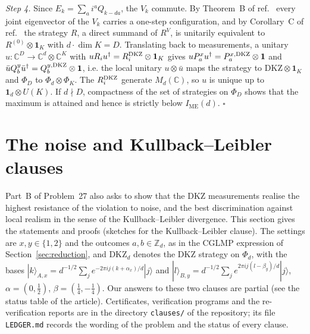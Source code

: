 \documentclass[11pt]{amsart}
\theoremstyle{definition}
\theoremstyle{remark}
\numberwithin{equation}{section}
\newcommand{\C}{\mathbb{C}}
\newcommand{\Z}{\mathbb{Z}}
\newcommand{\one}{\mathbf{1}}
\newcommand{\IME}{I_{\mathrm{ME}}}
\newcommand{\DKZ}{\mathrm{DKZ}}
\begin{document}
\emph{Step 4.} Since $E_k=\sum_ai^aQ_{k-da}$, the $V_k$ commute. By Theorem~B of ref.~\cite{classical} every joint
eigenvector of the $V_k$ carries a one-step configuration, and by Corollary~C of ref.~\cite{classical} the strategy
$R$, a direct summand of $R^V$, is unitarily equivalent to $R^{(0)}\otimes\one_K$ with $d\cdot\dim K=D$. Translating back
to measurements, a unitary $u:\C^D\to\C^d\otimes\C^K$ with $uR_iu^\dagger=R^{\rm DKZ}_i\otimes\one_K$ gives
$uP^x_au^\dagger=P^{x,\rm DKZ}_a\otimes\one$ and $\bar uQ^y_b\bar u^\dagger=Q^{y,\rm DKZ}_b\otimes\one$, i.e. the local
unitary $u\otimes\bar u$ maps the strategy to $\mathrm{DKZ}\otimes\one_K$ and $\Phi_D$ to $\Phi_d\otimes\Phi_K$. The
$R^{\rm DKZ}_i$ generate $M_d(\C)$, so $u$ is unique up to $\one_d\otimes U(K)$. If $d\nmid D$, compactness of the set
of strategies on $\Phi_D$ shows that the maximum is attained and hence is strictly below $\IME(d)$.
\hfill$\square$

\section{The noise and Kullback--Leibler clauses}\label{sec:clauses}

Part~B of Problem~27 also asks to show that the DKZ measurements realise the highest resistance of the violation to
noise, and the best discrimination against local realism in the sense of the Kullback--Leibler divergence\cite{vDGG}.
This section gives the statements and proofs (sketches for the Kullback--Leibler clause). The settings are
$x,y\in\{1,2\}$ and the outcomes $a,b\in\Z_d$, as in the CGLMP expression of Section~\ref{sec:reduction}, and $\DKZ_d$
denotes the DKZ strategy on $\Phi_d$, with the bases $|k\rangle_{A,x}=d^{-1/2}\sum_je^{-2\pi ij(k+\alpha_x)/d}|j\rangle$
and $|l\rangle_{B,y}=d^{-1/2}\sum_je^{2\pi ij(l-\beta_y)/d}|j\rangle$, $\alpha=(0,\frac12)$, $\beta=(\frac14,-\frac14)$.
Our answers to these two clauses are partial (see the status table of the article). Certificates, verification programs
and the re-verification reports are in the directory \texttt{clauses/} of the repository\cite{repoOQP}; its file
\texttt{LEDGER.md} records the wording of the problem\cite{OQP} and the status of every clause.
\end{document}
